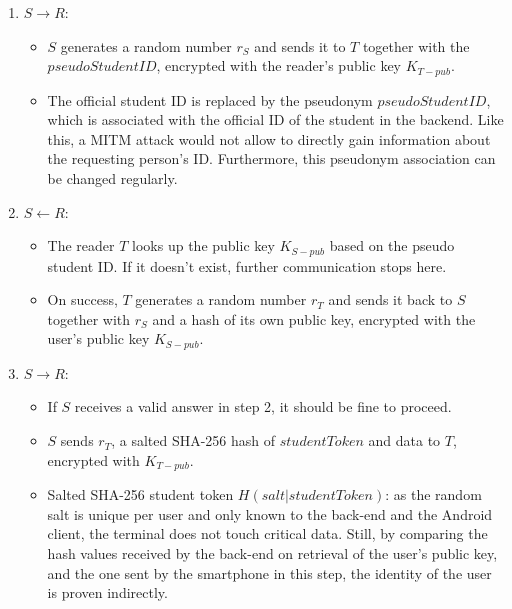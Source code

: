 \begin{enumerate}
	\item $ S \rightarrow R $:
	\begin{itemize}
		\item $ S $ generates a random number $ r_S $ and sends it to $ T $ together with the $ pseudoStudentID $, encrypted with the reader's public key $ K_{T-pub} $.
		\item The official student ID is replaced by the pseudonym $ pseudoStudentID $, which is associated with the official ID of the student in the backend.
		Like this, a MITM attack would not allow to directly gain information about the requesting person's ID.
		Furthermore, this pseudonym association can be changed regularly.
	\end{itemize}	
	\item $ S \leftarrow R $:
	\begin{itemize}
		\item The reader $ T $ looks up the public key $ K_{S-pub} $ based on the pseudo student ID. If it doesn't exist, further communication stops here.
		\item On success, $ T $ generates a random number $ r_T $ and sends it back to $ S $ together with $ r_S $ and a hash of its own public key, encrypted with the user's public key $ K_{S-pub} $.
	\end{itemize}	
	\item $ S \rightarrow R $:
	\begin{itemize}
		\item If $ S $ receives a valid answer in step 2, it should be fine to proceed.
		\item $ S $ sends $ r_T $, a salted SHA-256 hash of $ studentToken $ and data to $ T $, encrypted with $ K_{T-pub} $.
		\item Salted SHA-256 student token $ H(salt|studentToken) $: as the random salt is unique per user and only known to the back-end and the Android client, the terminal does not touch critical data.
		Still, by comparing the hash values received by the back-end on retrieval of the user's public key, and the one sent by the smartphone in this step, the identity of the user is proven indirectly.
	\end{itemize}
\end{enumerate}
